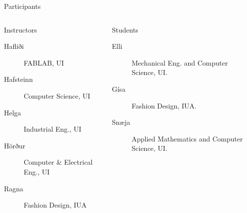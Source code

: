 \documentclass[
    NAME={Dr. Helga Ingimundardóttir},
    EMAIL={helgaingim@hi.is},
    FACULTY={Industrial Engineering},
    TITLE={HiDef Textiles: Reviving Tradition with Innovation},
    SUBTITLE={Empowering Creativity and Sustainability in Textile Production through Digital Transformation},
    SEMINAR={Reykjavík DataBeers},
    DATE={January 25, 2025},
    WIDE={true}
]{HI-LaTeX/hi-beamer}
\begin{document}
    \begin{frame}[allowframebreaks]{Participants}
        \begin{columns}
            \begin{column}{0.4\linewidth}
                \begin{block}{Instructors}
                    \begin{description}
                        \item[Hafliði] FABLAB, UI
                        \item[Hafsteinn] Computer Science, UI
                        \item[Helga] Industrial Eng., UI
                        \item[Hörður] Computer \& Electrical Eng., UI
                        \item[Ragna] Fashion Design, IUA
                    \end{description}
                \end{block}
            \end{column}

            \begin{column}{0.45\linewidth}
                \begin{block}{Students}
                    \begin{description}
                        \item[Elli] Mechanical Eng. and Computer Science, UI.
                        \item[Gísa] Fashion Design, IUA.
                        \item[Snæja] Applied Mathematics and Computer Science, UI.
                    \end{description}
                \end{block}
            \end{column}
        \end{columns}

        \framebreak


\end{frame}
\end{document}

